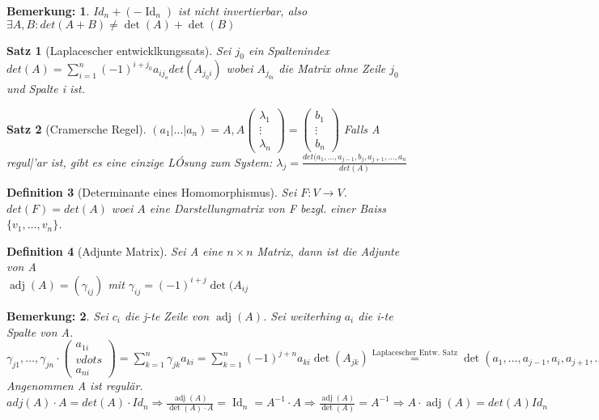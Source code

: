 \documentclass{report}
\newcommand{\lb}{\lambda}
\newcommand{\ve}[1]{{\begin{pmatrix}#1 \end{pmatrix}}}
\renewcommand{\v}{\ve}
\DeclareMathOperator{\Id}{Id}
\DeclareMathOperator{\adj}{adj}
\theoremstyle{customrem}
\newtheorem*{bemerkung}{Bemerkung\textnormal:}
\theoremstyle{customdef}
\newtheorem{definition}{Definition}[chapter]
\newtheorem{satz}[definition]{Satz}
\theoremstyle{customenv}
\begin{document}
\begin{bemerkung}
  \(Id_n + (-\Id_n)\) ist nicht invertierbar, also \(\exists A, B : det(A+B) \neq \det(A) + \det(B)\)
\end{bemerkung}

\begin{satz}[Laplacescher entwicklkungssats]
  Sei \(j_0\) ein Spaltenindex\\
  \(det(A) = \sum_{i=1}^n (-1)^{i+j_0} a_{ij_o} det(A_{j_0i})\) wobei
  \(A_{j_{0i}}\) die Matrix ohne Zeile \(j_0\) und Spalte i ist.
\end{satz}


\begin{satz}[Cramersche Regel]
  \((a_1 | \dots | a_n) = A, A \v{\lb_1\\ \vdots \\ \lb_n} = \v{b_1 \\ \vdots \\ b_n}\)
  Falls A regul|'ar ist, gibt es eine einzige L\'Osung zum System:
  \(\lb_j = \frac{det(a_1, \dots, a_{j-1}, b_j, a_{j+1}, \dots, a_n}{det(A)}\)
\end{satz}

\begin{definition}[Determinante eines Homomorphismus]
  Sei \(F : V \to V\). \(det(F) = det(A)\) woei \(A\) eine Darstellungmatrix von F bezgl. einer Baiss \(\{v_1, \dots, v_n\}\).
\end{definition}


\begin{definition}[Adjunte Matrix]
Sei A eine \(n\times n\) Matrix, dann ist die Adjunte von A\\
\(\adj(A) = (\gamma_{ij})\) mit \(\gamma_{ij} = (-1)^{i+ j} \det(A_{ij}\)
\end{definition}

\begin{bemerkung}
  Sei \(c_i\) die j-te Zeile von \(\adj(A)\). Sei weiterhing \(a_i\) die i-te
  Spalte von A.\\
  \(\gamma_{j1}, \dots, \gamma_{jn} \cdot \v{a_{1i}\ \\vdots \\ a_{ni}}
  = \sum_{k=1}^n \gamma_{jk} a_{ki} = \sum_{k=1}^n (-1)^{j+n} a_{ki} \det(A_{jk})
  \overset{\text{Laplacescher Entw. Satz}}{=}
  \det(a_1, \dots, a_{j-1} , a_i, a_{j+1}, \dots, a_n) =
  \begin{cases}
   \det(A) & j=i\\
   0 & j \neq i
  \end{cases}\)\\
  Angenommen A ist regul\"ar.\\
  \(adj(A) \cdot A = det(A) \cdot Id_n
    \Rightarrow \frac{\adj(A)}{\det(A) \cdot A} = \Id_n = A^{-1} \cdot A
    \Rightarrow \frac{\adj(A)}{\det(A)} = A^{-1}
    \Rightarrow A \cdot \adj(A) = det(A) Id_n
  \)
\end{bemerkung}
\end{document}
